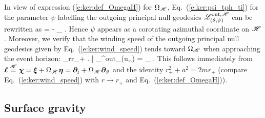 In view of expression (\ref{e:ker:def_OmegaH}) for $\Omega_{\mathscr{H}}$,
Eq.~(\ref{e:ker:psi_tph_ti}) for the parameter $\psi$
labelling the outgoing principal null geodesics $\mathscr{L}^{{\rm out},\mathscr{H}}_{(\theta,\psi)}$
can be rewritten as
\be
    \psi = \tph - \Omega_{\Hor} \ti .
\ee
Hence $\psi$ appears as a corotating azimuthal coordinate on $\mathscr{H}$.
Moreover, we verify that the winding speed of the outgoing principal
null geodesics given by Eq.~(\ref{e:ker:wind_speed}) tends toward
$\Omega_{\mathscr{H}}$ when approaching the event horizon:
\be
    \lim_{r\rightarrow r_+}
    \left. \frac{\D\tph}{\D\ti} \right| _{\Li^{\rm out}_{(u,\th,\tilde{\tph})}}
    = \Omega_{\Hor} .
\ee
This follows immediately from
$\bm{\ell} \stackrel{\mathscr{H}}{=} \bm{\chi} = \bm{\xi} + \Omega_{\mathscr{H}} \bm{\eta} = \bm{\partial}_{{\tilde t}}
    + \Omega_{\mathscr{H}} \bm{\partial}_{{\tilde\varphi}} $
and the identity $r_+^2 + a^2 = 2 m r_+$ (compare Eq.~(\ref{e:ker:wind_speed})
with $r\rightarrow r_+$ and Eq.~(\ref{e:ker:def_OmegaH})).


\subsection{Surface gravity} \label{s:ker:surf_grav}

